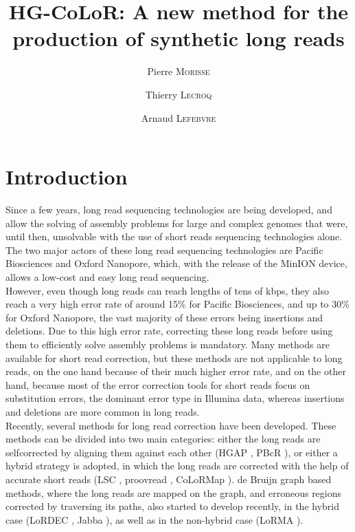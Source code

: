 \documentclass[long, final]{jobim2017}
\title{HG-CoLoR: A new method for the production of synthetic long reads}
\author{Pierre \textsc{Morisse} \and Thierry \textsc{Lecroq} \and Arnaud \textsc{Lefebvre}}
\institute{
 Normandie-Université, UNIROUEN, LITIS EA4108, 76821, Mt-St-Aignan, France
}
\begin{document}

\maketitle


\section{Introduction}
\label{sec:introduction}

Since a few years, long read sequencing technologies are being developed, and allow the solving of assembly problems for large and complex genomes that were, until then, unsolvable with the use of short reads sequencing technologies alone. The two major actors of these long
read sequencing technologies are Pacific Biosciences and Oxford Nanopore, which, with the release of the MinION device, allows a low-cost and easy long read sequencing. \\
\indent However, even though long reads can reach lengths of tens of kbps, they also reach a very high error rate of around 15\% for Pacific Biosciences, and up to 30\% for Oxford Nanopore, the vast majority of these errors being insertions and deletions. Due to this high error rate, correcting these long reads before using them to efficiently solve assembly problems is mandatory. Many methods are available for short read correction, but these methods are not applicable to long reads, on the one hand because of their much higher error rate, and on the other hand, because most of the error correction tools for short reads focus on substitution errors, the dominant error type in Illumina data, whereas insertions and deletions are more common in long reads. \\
\indent Recently, several methods for long read correction have been developed. These methods can be divided into two main categories: either
the long reads are selfcorrected by aligning them against each other (HGAP \cite{Chin2013}, PBcR \cite{Berlin2015}), or either a hybrid strategy is adopted, in which the long reads are corrected with the help of accurate short reads (LSC \cite{Au2012}, proovread \cite{Hackl2014}, CoLoRMap \cite{Haghshenas2016}). de Bruijn graph \cite{deBruijn1946} based methods, where the long reads are mapped on the graph, and erroneous regions corrected by traversing its paths, also started to develop recently, in the hybrid case (LoRDEC \cite{Salmela2014}, Jabba \cite{Miclotte2016}), as well as in the non-hybrid case (LoRMA \cite{Salmela2016}). \\
\end{document}
